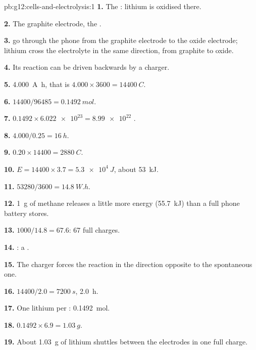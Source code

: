 \begin{solution}{pb:g12:cells-and-electrolysis:1}
\textbf{1.} The : lithium is oxidised there.

\textbf{2.} The graphite electrode, the .

\textbf{3.}  go through the phone from the graphite electrode to
the oxide electrode; lithium  cross the electrolyte in the same
direction, from graphite to oxide.

\textbf{4.} Its reaction can be driven backwards by a charger.

\textbf{5.} \qty{4.000}{A.h}, that is $4.000 \times 3600 =
\qty{14400}{C}$.

\textbf{6.} $14400/96485 = \qty{0.1492}{mol}$.

\textbf{7.} $0.1492 \times \num{6.022e23} = \num{8.99e22}$ .

\textbf{8.} $4.000/0.25 = \qty{16}{h}$.

\textbf{9.} $0.20 \times 14400 = \qty{2880}{C}$.

\textbf{10.} $E = 14400 \times 3.7 = \qty{5.3e4}{J}$, about \qty{53}{kJ}.

\textbf{11.} $53280/3600 = \qty{14.8}{W.h}$.

\textbf{12.}  \qty{1}{g} of methane releases a little more
energy (\qty{55.7}{kJ}) than a full phone battery stores.

\textbf{13.} $1000/14.8 = 67.6$: 67 full charges.

\textbf{14.} : a .

\textbf{15.} The charger forces the reaction in the direction opposite to
the spontaneous one.

\textbf{16.} $14400/2.0 = \qty{7200}{s}$, \qty{2.0}{h}.

\textbf{17.} One lithium  per : \qty{0.1492}{mol}.

\textbf{18.} $0.1492 \times 6.9 = \qty{1.03}{g}$.

\textbf{19.} About \qty{1.03}{g} of lithium shuttles between the
electrodes in one full charge.
\end{solution}
